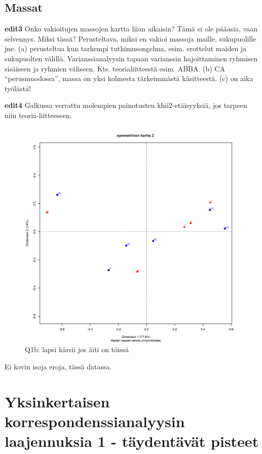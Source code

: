 \documentclass[
  finnish,
]{book}
\begin{document}
\hypertarget{massat}{%
\section{Massat}\label{massat}}

\textbf{edit3} Onko vakioitujen massojen kartta liian aikaisin? Tämä ei
ole pääasia, vaan selvennys. Miksi tässä? Perusteltava, miksi en vakioi
massoja maille, sukupuolille jne. (a) perusteltua kun tarkempi
tutkimusongelma, esim. erottelut maiden ja sukupuolten välillä.
Varianssianalyysin tapaan varianssin hajoittaminen ryhmisen sisäiseen ja
ryhmien väliseen. Kts. teorialiitteestä esim. ABBA. (b) CA
``perusmuodossa'', massa on yksi kolmesta tärkeimmästä käsitteestä. (c)
on aika työlästä!

\textbf{edit4} Galkussa verrattu molempien painotusten
khii2-etäisyyksiä, jos tarpeen niin teoria-liitteeseen.

\begin{figure}

{\centering \includegraphics[width=0.9\linewidth]{JH_capaper_files/figure-latex/simpleCA3map1-1} 

}

\caption{Q1b: lapsi kärsii jos äiti on töissä}\label{fig:simpleCA3map1}
\end{figure}

Ei kovin isoja eroja, tässä datassa.

\hypertarget{yksinkertaisen-korrespondenssianalyysin-laajennuksia-1---tuxe4ydentuxe4vuxe4t-pisteet}{%
\chapter{Yksinkertaisen korrespondenssianalyysin laajennuksia 1 -
täydentävät
pisteet}\label{yksinkertaisen-korrespondenssianalyysin-laajennuksia-1---tuxe4ydentuxe4vuxe4t-pisteet}}
\end{document}
